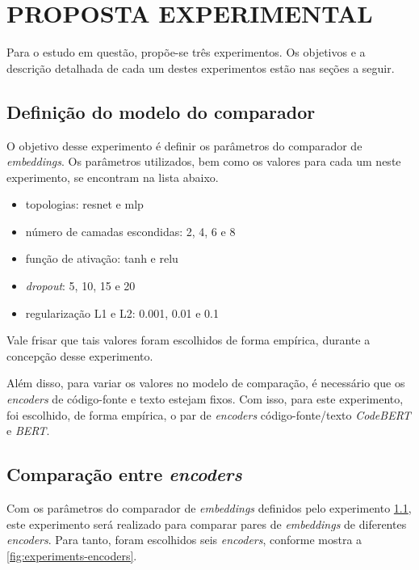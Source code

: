 \chapter{PROPOSTA EXPERIMENTAL}
\label{chp:experiments}

Para o estudo em questão, propõe-se três experimentos. Os objetivos e a descrição detalhada de cada um destes experimentos estão nas seções a seguir.


\section{Definição do modelo do comparador}
\label{sec:experiments:emb-comparator}
O objetivo desse experimento é definir os parâmetros do comparador de \textit{embeddings}. Os parâmetros utilizados, bem como os valores para cada um neste experimento, se encontram na lista abaixo.

\begin{itemize}
    \item topologias: \gls{resnet} e \gls{mlp}
    \item número de camadas escondidas: 2, 4, 6 e 8
    \item função de ativação: \gls{tanh} e \gls{relu}
    \item \textit{dropout}: 5, 10, 15 e 20
    \item regularização L1 e L2: 0.001, 0.01 e 0.1
\end{itemize}

Vale frisar que tais valores foram escolhidos de forma empírica, durante a concepção desse experimento. 

Além disso, para variar os valores no modelo de comparação, é necessário que os \textit{encoders} de código-fonte e texto estejam fixos. Com isso, para este experimento, foi escolhido, de forma empírica, o par de \textit{encoders} código-fonte/texto \textit{CodeBERT} e \textit{BERT}.

\section{Comparação entre \textit{encoders}}
\label{sec:experiments:encoders}
Com os parâmetros do comparador de \textit{embeddings} definidos pelo experimento \ref{sec:experiments:emb-comparator}, este experimento será realizado para comparar pares de \textit{embeddings} de diferentes \textit{encoders}. Para tanto, foram escolhidos seis \textit{encoders}, conforme mostra a \ref{fig:experiments-encoders}.

